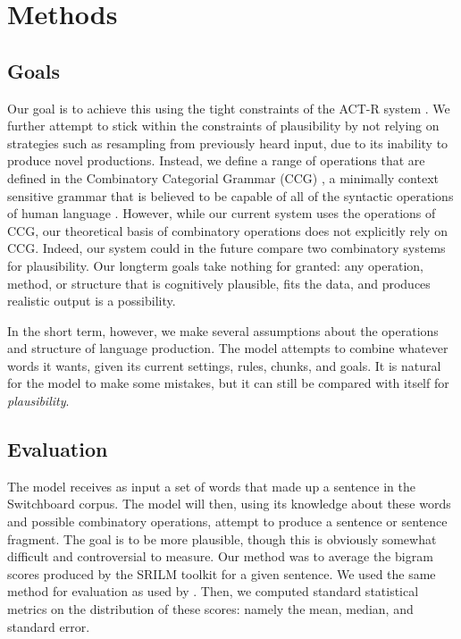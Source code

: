 \section{Methods}
\subsection{Goals}
Our goal is to achieve this using the tight constraints of the ACT-R system \citep{actr}. We further attempt to stick within the constraints of plausibility by not relying on strategies such as resampling from previously heard input, due to its inability to produce novel productions. Instead, we define a range of operations that are defined in the Combinatory Categorial Grammar (CCG) \citep{ccg}, a minimally context sensitive grammar that is believed to be capable of all of the syntactic operations of human language \citep{convergence}. However, while our current system uses the operations of CCG, our theoretical basis of combinatory operations does not explicitly rely on CCG. Indeed, our system could in the future compare two combinatory systems for plausibility. Our longterm goals take nothing for granted: any operation, method, or structure that is cognitively plausible, fits the data, and produces realistic output is a possibility. 

In the short term, however, we make several assumptions about the operations and structure of language production. The model attempts to combine whatever words it wants, given its current settings, rules, chunks, and goals. It is natural for the model to make some mistakes, but it can still be compared with itself for \textit{plausibility}.

\subsection{Evaluation}
The model receives as input a set of words that made up a sentence in the Switchboard corpus. The model will then, using its knowledge about these words and possible combinatory operations, attempt to produce a sentence or sentence fragment. The goal is to be more plausible, though this is obviously somewhat difficult and controversial to measure. Our method was to average the bigram scores produced by the SRILM toolkit \citep{srilm} for a given sentence. We used the same method for evaluation as used by \citet{chart}. Then, we computed standard statistical metrics on the distribution of these scores: namely the mean, median, and standard error.


